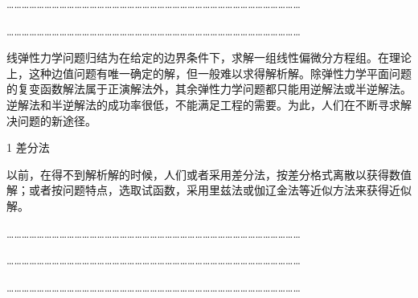 

\setcounter{page}{1} 
\begin{raggedright}{\bfseries\xiaoer{}} %

\end{raggedright}
\setlength{\parskip}{0pt}
  ………………………………………………………………………………………………………\par
   ………………………………………………………………………………………………………

线弹性力学问题归结为在给定的边界条件下，求解一组线性偏微分方程组。在理论上，这种边值问题有唯一确定的解，但一般难以求得解析解。除弹性力学平面问题的复变函数解法属于正演解法外，其余弹性力学问题都只能用逆解法或半逆解法。逆解法和半逆解法的成功率很低，不能满足工程的需要。为此，人们在不断寻求解决问题的新途径。\par
 1 差分法\par
 以前，在得不到解析解的时候，人们或者采用差分法，按差分格式离散以获得数值解；或者按问题特点，选取试函数，采用里兹法或伽辽金法等近似方法来获得近似解。

  ………………………………………………………………………………………………………\par
   ………………………………………………………………………………………………………\par
   ………………………………………………………………………………………………………



